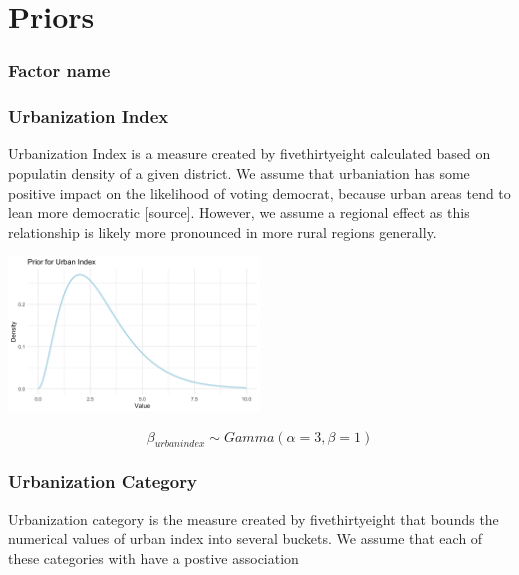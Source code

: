 \documentclass{beamer}
\begin{document}
\section{Priors}

\begin{frame}
  \frametitle{Factor name}


\end{frame}

\begin{frame}
  \frametitle{Urbanization Index}
  Urbanization Index is a measure created by fivethirtyeight calculated based on populatin density of a given district.
  We assume that urbaniation has some positive impact on the likelihood of voting democrat, because urban areas tend to lean more democratic [source]. 
  However, we assume a regional effect as this relationship is likely more pronounced in more rural regions generally. %
  \begin{center}
    \includegraphics[width=0.5\textwidth]{plots/prior_urban.index.png}
  \end{center}
 
  
  $$ \beta_{urbanindex} \sim Gamma(\alpha = 3, \beta = 1 )$$ 
  \end{frame}

\begin{frame}
  \frametitle{Urbanization Category}
  Urbanization category is the measure created by fivethirtyeight that bounds the numerical values of urban index into several buckets. 
  We assume that each of these categories with have a postive association 

\end{frame}
\end{document}
